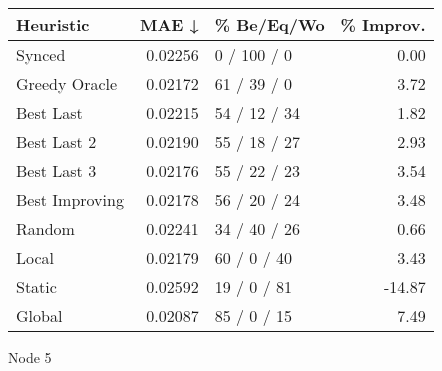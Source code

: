 \begin{tabular}{lrlr}
\toprule
\textbf{Heuristic} & \textbf{MAE ↓} & \textbf{\% Be/Eq/Wo} & \textbf{\% Improv.} \\
\midrule
            Synced &        0.02256 &          0 / 100 / 0 &                0.00 \\
     Greedy Oracle &        0.02172 &          61 / 39 / 0 &                3.72 \\
         Best Last &        0.02215 &         54 / 12 / 34 &                1.82 \\
       Best Last 2 &        0.02190 &         55 / 18 / 27 &                2.93 \\
       Best Last 3 &        0.02176 &         55 / 22 / 23 &                3.54 \\
    Best Improving &        0.02178 &         56 / 20 / 24 &                3.48 \\
            Random &        0.02241 &         34 / 40 / 26 &                0.66 \\
             Local &        0.02179 &          60 / 0 / 40 &                3.43 \\
            Static &        0.02592 &          19 / 0 / 81 &              -14.87 \\
            Global &        0.02087 &          85 / 0 / 15 &                7.49 \\
\bottomrule
\end{tabular}
\caption{Node 5}
\label{tab:iid_lr01_le1_bs4_5}
